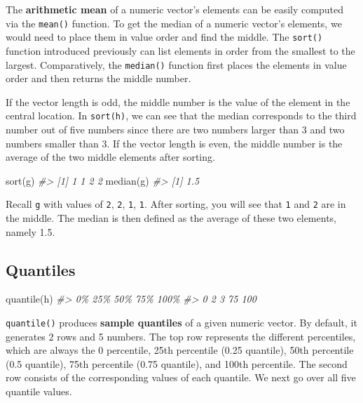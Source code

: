 \documentclass[
]{book}
\newenvironment{Shaded}{\begin{snugshade}}{\end{snugshade}}
\newcommand{\CommentTok}[1]{\textcolor[rgb]{0.56,0.35,0.01}{\textit{#1}}}
\newcommand{\FunctionTok}[1]{\textcolor[rgb]{0.00,0.00,0.00}{#1}}
\newcommand{\NormalTok}[1]{#1}
\newenvironment{blackbox}{
  \definecolor{shadecolor}{rgb}{0, 0, 0}  %
  \color{white}
  \begin{shaded}}
 {\end{shaded}}
\newenvironment{infobox}[1]
  {
  \begin{itemize}
  \renewcommand{\labelitemi}{
    \raisebox{-.7\height}[0pt][0pt]{
      {\setkeys{Gin}{width=3em,keepaspectratio}
        \texttt{[image: pics/\#1]}}
    }
  }
  \setlength{\fboxsep}{1em}
  \begin{blackbox}
  \item
  }
  {
  \end{blackbox}
  \end{itemize}
  }
\begin{document}
The \textbf{arithmetic mean} of a numeric vector's elements can be easily computed via the \texttt{mean()} function. To get the median of a numeric vector's elements, we would need to place them in value order and find the middle. The \texttt{sort()} function introduced previously can list elements in order from the smallest to the largest. Comparatively, the \texttt{median()} function first places the elements in value order and then returns the middle number.

If the vector length is odd, the middle number is the value of the element in the central location. In \texttt{sort(h)}, we can see that the median corresponds to the third number out of five numbers since there are two numbers larger than 3 and two numbers smaller than 3. If the vector length is even, the middle number is the average of the two middle elements after sorting.

\begin{infobox}{caution}

\begin{Shaded}
\begin{Highlighting}[]
\FunctionTok{sort}\NormalTok{(g)}
\CommentTok{\#\textgreater{} [1] 1 1 2 2}
\FunctionTok{median}\NormalTok{(g)}
\CommentTok{\#\textgreater{} [1] 1.5}
\end{Highlighting}
\end{Shaded}

Recall \texttt{g} with values of \texttt{2}, \texttt{2}, \texttt{1}, \texttt{1}. After sorting, you will see that \texttt{1} and \texttt{2} are in the middle. The median is then defined as the average of these two elements, namely 1.5.

\end{infobox}

\hypertarget{quantiles}{%
\subsection{Quantiles}\label{quantiles}}

\begin{Shaded}
\begin{Highlighting}[]
\FunctionTok{quantile}\NormalTok{(h)}
\CommentTok{\#\textgreater{}   0\%  25\%  50\%  75\% 100\% }
\CommentTok{\#\textgreater{}    0    2    3   75  100}
\end{Highlighting}
\end{Shaded}

\texttt{quantile()} produces \textbf{sample quantiles} of a given numeric vector. By default, it generates 2 rows and 5 numbers. The top row represents the different percentiles, which are always the 0 percentile, 25th percentile (0.25 quantile), 50th percentile (0.5 quantile), 75th percentile (0.75 quantile), and 100th percentile. The second row consists of the corresponding values of each quantile. We next go over all five quantile values.
\end{document}

